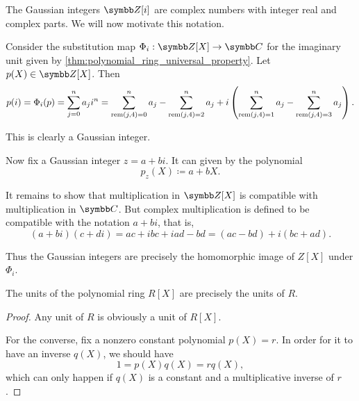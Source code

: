 \begin{example}\label{ex:polynomial_evaluation_gaussian_integers}
  The Gaussian integers \( \Z[i] \) are complex numbers with integer real and complex parts. We will now motivate this notation.

  Consider the substitution map \( \Phi_i: \Z[X] \to \C \) for the imaginary unit given by \cref{thm:polynomial_ring_universal_property}. Let \( p(X) \in \Z[X] \). Then
  \begin{equation*}
    p(i)
    =
    \Phi_i(p)
    =
    \sum_{j=0}^n a_j i^n
    =
    \sum_{\operatorname{rem}(j, 4) = 0}^n a_j - \sum_{\operatorname{rem}(j, 4) = 2}^n a_j + i \left(\sum_{\operatorname{rem}(j, 4) = 1}^n a_j - \sum_{\operatorname{rem}(j, 4) = 3}^n a_j \right).
  \end{equation*}

  This is clearly a Gaussian integer.

  Now fix a Gaussian integer \( z = a + bi \). It can given by the polynomial
  \begin{equation*}
    p_z(X) \coloneqq a + bX.
  \end{equation*}

  It remains to show that multiplication in \( \Z[X] \) is compatible with multiplication in \( \C \). But complex multiplication is defined to be compatible with the notation \( a + bi \), that is,
  \begin{equation*}
    (a + bi) (c + di)
    =
    ac + ibc + iad - bd
    =
    (ac - bd) + i(bc + ad).
  \end{equation*}

  Thus the Gaussian integers are precisely the homomorphic image of \( Z[X] \) under \( \Phi_i \).
\end{example}

\begin{proposition}\label{thm:polynomial_ring_units}
  The units of the polynomial ring \( R[X] \) are precisely the units of \( R \).
\end{proposition}
\begin{proof}
  Any unit of \( R \) is obviously a unit of \( R[X] \).

  For the converse, fix a nonzero constant polynomial \( p(X) = r \). In order for it to have an inverse \( q(X) \), we should have
  \begin{equation*}
    1 = p(X) q(X) = r q(X),
  \end{equation*}
  which can only happen if \( q(X) \) is a constant and a multiplicative inverse of \( r \).
\end{proof}

